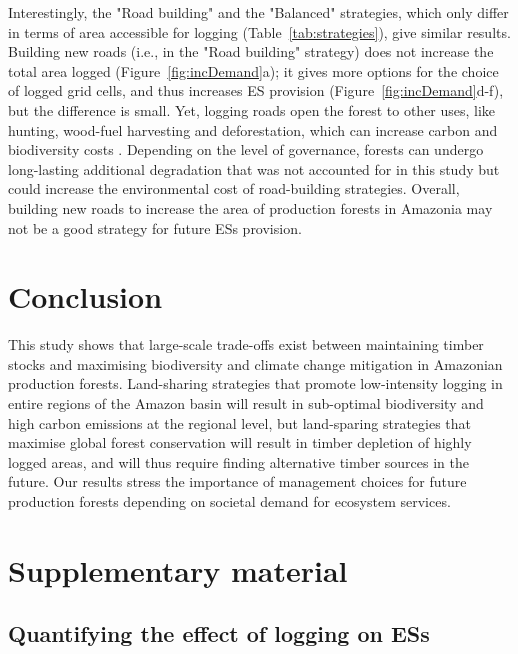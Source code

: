 \documentclass{article}
\begin{document}
Interestingly, the "Road building" and the "Balanced" strategies, which only differ in terms of area accessible for logging (Table~\ref{tab:strategies}), give similar results.
Building new roads (i.e., in the "Road building" strategy) does not increase the total area logged (Figure~\ref{fig:incDemand}a); it gives more options for the choice of logged grid cells, and thus increases ES provision (Figure~\ref{fig:incDemand}d-f), but the difference is small. 
Yet, logging roads open the forest to other uses, like hunting, wood-fuel harvesting and deforestation, which can increase carbon and biodiversity costs \cite{Laurance2009a}. Depending on the level of governance, forests can undergo long-lasting additional degradation that was not accounted for in this study but could increase the environmental cost of road-building strategies. Overall, building new roads to increase the area of production forests in Amazonia may not be a good strategy for future ESs provision. 

\section{Conclusion}

This study shows that large-scale trade-offs exist between maintaining timber stocks and maximising biodiversity and climate change mitigation in Amazonian production forests. Land-sharing strategies that promote low-intensity logging in entire regions of the Amazon basin will result in sub-optimal biodiversity and high carbon emissions at the regional level, but land-sparing strategies that maximise global forest conservation will result in timber depletion of highly logged areas, and will thus require finding alternative timber sources in the future. Our results stress the importance of management choices for future production forests depending on societal demand for ecosystem services. 

\clearpage





\clearpage

\section{Supplementary material}


\subsection{Quantifying the effect of logging on ESs}
\label{sec:ESestimation}
\end{document}
